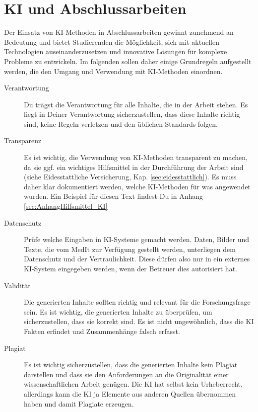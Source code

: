 \section{KI und Abschlussarbeiten}\label{sect:KItools}
Der Einsatz von KI-Methoden in Abschlussarbeiten gewinnt zunehmend an Bedeutung und bietet Studierenden die Möglichkeit, sich mit aktuellen Technologien auseinanderzusetzen und innovative Lösungen für komplexe Probleme zu entwickeln. Im folgenden sollen daher einige Grundregeln aufgestellt werden, die den Umgang und Verwendung mit KI-Methoden einordnen. 

\begin{description}
	\item[Verantwortung]
	Du trägst die Verantwortung für alle Inhalte, die in der Arbeit stehen. Es liegt in Deiner Verantwortung sicherzustellen, dass diese Inhalte richtig sind, keine Regeln verletzen und den üblichen Standards folgen.
	\item[Transparenz] Es ist wichtig, die Verwendung von KI-Methoden transparent zu machen, da sie ggf. ein wichtiges Hilfsmittel in der Durchführung der Arbeit sind (siehe Eidesstattliche Versicherung, Kap. \ref{sec:eidesstattlich}). Es muss daher klar dokumentiert werden, welche KI-Methoden für was angewendet wurden. Ein Beispiel für diesen Text findest Du in Anhang \ref{sec:AnhangHilfsmittel_KI}
	\item[Datenschutz] Prüfe welche Eingaben in KI-Systeme gemacht werden. Daten, Bilder und Texte, die vom MedIt zur Verfügung gestellt werden, unterliegen dem Datenschutz und der Vertraulichkeit. Diese dürfen also nur in ein externes KI-System eingegeben werden, wenn der Betreuer dies autorisiert hat.
	\item[Validität] Die generierten Inhalte sollten richtig und relevant für die Forschungsfrage sein. Es ist wichtig, die generierten Inhalte zu überprüfen, um sicherzustellen, dass sie korrekt sind. Es ist nicht ungewöhnlich, dass die KI Fakten erfindet und Zusammenhänge falsch erfasst. 
		\item[Plagiat] Es ist wichtig sicherzustellen, dass die generierten Inhalte kein Plagiat darstellen und dass sie den Anforderungen an die Originalität einer wissenschaftlichen Arbeit genügen. Die KI hat selbst kein Urheberrecht, allerdings kann die KI ja Elemente aus anderen Quellen übernommen haben und damit Plagiate erzeugen.
\end{description}


